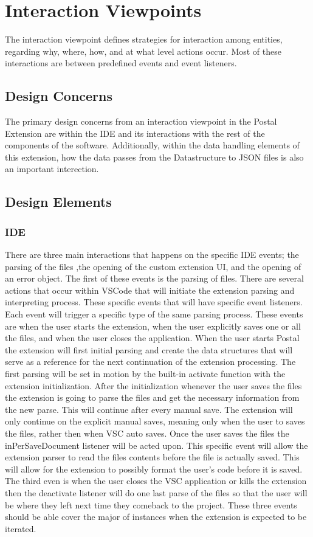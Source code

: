 \documentclass[letterpaper,10pt,titlepage,draftclsnofoot,onecolumn,onesided] {IEEEtran}
\begin{document}
\section{Interaction Viewpoints}
The interaction viewpoint defines strategies for interaction among entities, regarding why, where, how, and
at what level actions occur. Most of these interactions are between predefined events and event listeners.
\subsection{Design Concerns}
The primary design concerns from an interaction viewpoint in the Postal Extension are within the IDE and its interactions with the rest of the components of the software.
Additionally, within the data handling elements of this extension, how the data passes from the Datastructure to JSON files is also an important interection.

\subsection{Design Elements}

\subsubsection{IDE}	
	There are three main interactions that happens on the specific IDE events; the parsing of the files ,the opening of the custom extension UI, and the opening of an error object.
	The first of these events is the parsing of files. 
	There are several actions that occur within VSCode that will initiate the extension parsing and interpreting process.
	These specific events that will have specific event listeners. 
	Each event will trigger a specific type of the same parsing process.
	These events are when the user starts the extension, when the user explicitly saves one or all the files, and when the user closes the application.
	When the user starts Postal the extension will first initial parsing and create the data structures that will serve as a reference for the next continuation of the extension processing.
	The first parsing will be set in motion by the built-in activate function with the extension initialization. 
	After the initialization whenever the user saves the files the extension is going to parse the files and get the necessary information from the new parse. 
	This will continue after every manual save.
	The extension will only continue on the explicit manual saves, meaning only when the user to saves the files, rather then when VSC auto saves. 
	Once the user saves the files the inPerSaveDocument listener will be acted upon.\cite{VSCodeDocumentation}
	This specific event will allow the extension parser to read the files contents before the file is actually saved.
	This will allow for the extension to possibly format the user's code before it is saved.
	The third even is when the user closes the VSC application or kills the extension then the deactivate listener will do one last parse of the files so that the user will be where they left next time they 	comeback to the project.
	These three events should be able cover the major of instances when the extension is expected to be iterated.
	
\end{document}
